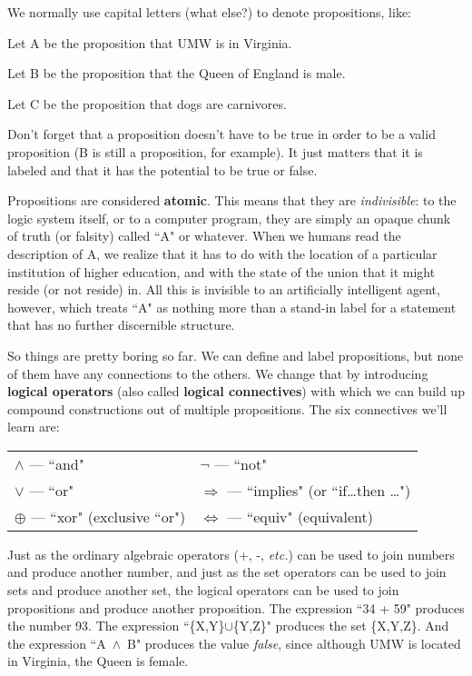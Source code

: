 We normally use capital letters (what else?) to denote propositions, like:

\quad\quad Let A be the proposition that UMW is in Virginia.

\quad\quad Let B be the proposition that the Queen of England is male.

\quad\quad Let C be the proposition that dogs are carnivores.

Don't forget that a proposition doesn't have to be true in order to be a
valid proposition (B is still a proposition, for example). It just matters
that it is labeled and that it has the potential to be true or false. 

Propositions are considered \textbf{atomic}. This means that they are
\textit{indivisible}: to the logic system itself, or to a computer program,
they are simply an opaque chunk of truth (or falsity) called ``A" or
whatever. When we humans read the description of A, we realize that it has
to do with the location of a particular institution of higher education,
and with the state of the union that it might reside (or not reside) in.
All this is invisible to an artificially intelligent agent, however, which
treats ``A" as nothing more than a stand-in label for a statement that has
no further discernible structure.

So things are pretty boring so far. We can define and label propositions,
but none of them have any connections to the others. We change that by
introducing \textbf{logical operators} (also called \textbf{logical
connectives}) with which we can build up compound constructions out of
multiple propositions. The six connectives we'll learn are:

\begin{center}
\begin{tabular}{l l}
$\wedge$ --- ``and" & \quad $\neg$ --- ``not"  \\
$\vee$ --- ``or" & \quad $\Rightarrow$ --- ``implies" (or ``if\dots then \dots") \\
$\oplus$ --- ``xor" (exclusive ``or") & \quad $\Leftrightarrow$ --- ``equiv" (equivalent)\\
\end{tabular}
\end{center}

Just as the ordinary algebraic operators (+, -, \textit{etc.}) can be used
to join numbers and produce another number, and just as the set operators
can be used to join sets and produce another set, the logical operators can
be used to join propositions and produce another proposition. The
expression ``34 + 59" produces the number 93. The expression
``\{X,Y\}$\cup$\{Y,Z\}" produces the set \{X,Y,Z\}. And the expression
``A~$\wedge$~B" produces the value \textsl{false}, since although UMW is
located in Virginia, the Queen is female.

